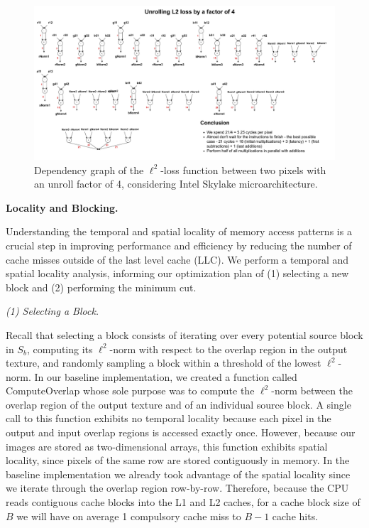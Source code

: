 \documentclass[letterpaper]{article}
\newcommand{\mypar}[1]{{\bf #1.}}
\newcommand{\inline}[1]{{\ttfamily\hyphenchar\font=45 #1}}
\begin{document}
\begin{figure}[htb]
\centering
  \includegraphics[scale=0.18]{Unrolling.pdf}
  \caption{Dependency graph of the $\ell^2$-loss function between two pixels with an unroll factor of 4, considering Intel Skylake microarchitecture.\label{unroll}}
\end{figure}

\mypar{Locality and Blocking}

Understanding the temporal and spatial locality of memory access patterns is a crucial step in improving performance and efficiency by reducing the number of cache misses outside of the last level cache (LLC). We perform a temporal and spatial locality analysis, informing our optimization plan of (1) selecting a new block and (2) performing the minimum cut. 

\textit{(1) Selecting a Block.}

Recall that selecting a block consists of iterating over every potential source block in $S_b$, computing its $\ell ^2$-norm with respect to the overlap region in the output texture, and randomly sampling a block within a threshold of the lowest $\ell ^2$-norm. In our baseline implementation, we created a function called \inline{ComputeOverlap} whose sole purpose was to compute the $\ell ^2$-norm between the overlap region of the output texture and of an individual source block. A single call to this function exhibits no temporal locality because each pixel in the output and input overlap regions is accessed exactly once. However, because our images are stored as two-dimensional arrays, this function exhibits spatial locality, since pixels of the same row are stored contiguously in memory. In the baseline implementation we already took advantage of the spatial locality since we iterate through the overlap region row-by-row. Therefore, because the CPU reads contiguous cache blocks into the L1 and L2 caches, for a cache block size of $B$ we will have on average 1 compulsory cache miss to $B-1$ cache hits.
\end{document}
